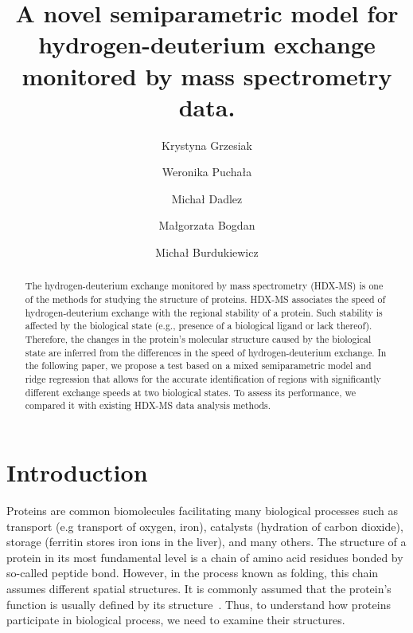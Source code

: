 \documentclass[]{MathAppl18}
\title{A novel semiparametric model for hydrogen-deuterium exchange monitored by mass spectrometry data.}
\author[K, Grzesiak]{Krystyna Grzesiak\orcid{0000-0003-2581-7722}}
\affiliation{University of Wroc{\l}aw}
\author[W. Puchała]{Weronika Puchała\orcid{0000-0003-2163-1429} \footnotemark[1]}
\affiliation{Polish Academy of Sciences}
\author[M. Dadlez]{Michał Dadlez\orcid{0000-0001-8811-5176} \footnotemark[1]}
\affiliation{Polish Academy of Sciences}
\author[M. Bogdan]{Małgorzata Bogdan\orcid{0000-0002-0657-4342}}
\affiliation{University of Wroc{\l}aw}
\author[M. Burdukiewicz]{Michał Burdukiewicz\orcid{0000-0001-8926-582X} \footnotemark[1]}
\affiliation{Medical University of Bialystok}
\begin{document}
\vspace{-5ex}

\setcounter{page}{193} 
\Polskifalse

\begin{abstract}
The hydrogen-deuterium exchange monitored by mass spectrometry (HDX-MS) is one of the methods for studying the structure of proteins. HDX-MS associates the speed of hydrogen-deuterium exchange with the regional stability of a protein. Such stability is affected by the biological state (e.g., presence of a biological ligand or lack thereof). Therefore, the changes in the protein's molecular structure caused by the biological state are inferred from the differences in the speed of hydrogen-deuterium exchange. In the following paper, we propose a test based on a mixed semiparametric model and ridge regression that allows for the accurate identification of regions with significantly different exchange speeds at two biological states. To assess its performance, we compared it with existing HDX-MS data analysis methods.\end{abstract}

\section{Introduction}

Proteins are common biomolecules facilitating many biological processes such as transport (e.g transport of oxygen, iron), catalysts (hydration of carbon dioxide), storage (ferritin stores iron ions in the liver), and many others. The structure of a protein in its most fundamental level is a chain of amino acid residues bonded by so-called peptide bond. However, in the process known as folding, this chain assumes different spatial structures. It is commonly assumed that the protein's function is usually defined by its structure~\citep{anfinsen1972formation}. %
Thus, to understand how proteins participate in biological process, we need to examine their structures. 
\end{document}

